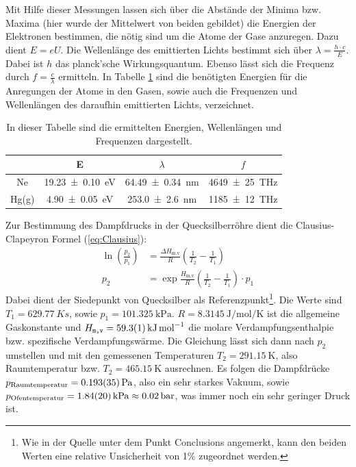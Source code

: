 	Mit Hilfe dieser Messungen lassen sich über die Abstände der Minima bzw. Maxima (hier wurde der Mittelwert von beiden gebildet) die Energien der Elektronen bestimmen, die nötig sind um die Atome der Gase anzuregen.
	Dazu dient $E=eU$. 
	Die Wellenlänge des emittierten Lichts bestimmt sich über $\lambda = \frac{h \cdot c}{E}$.
	Dabei ist $h$ das planck'sche Wirkungsquantum.
	Ebenso lässt sich die Frequenz durch $f = \frac{c}{\lambda}$ ermitteln. 
	In Tabelle \ref{tab:Werte} sind die benötigten Energien für die Anregungen der Atome in den Gasen, sowie auch die Frequenzen und Wellenlängen des daraufhin emittierten Lichts, verzeichnet.
	\begin{table}
		\caption{In dieser Tabelle sind die ermittelten Energien, Wellenlängen und Frequenzen dargestellt.}
		\label{tab:Werte}
		\centering
		\begin{tabular}{c|c|c|c}
			& E & $\lambda$ & $f$ \\			
			\hline		
			Ne & \SI{19.23+-0.10}{\electronvolt} & \SI{64.49+-0.34}{\nano\meter} & \SI{4649+-25}{\tera\hertz} \\
			Hg(g) & \SI{4.90+-0.05}{\electronvolt} & \SI{253.0+-2.6}{\nano\meter} & \SI{1185+-12}{\tera\hertz} \\				
		\end{tabular}
	\end{table}

	Zur Bestimmung des Dampfdrucks in der Quecksilberröhre dient die Clausius-Clapeyron Formel (\ref{eq:Clausius}):
	\begin{align} \label{eq:Clausius}
		\ln(\frac{p_2}{p_1}) &= \frac{\Delta H_\text{m,v}}{R}\left( \frac{1}{T_2} - \frac{1}{T_1} \right) \\
		p_2 &= \exp{\frac{H_\text{m,v}}{R} \left( \frac{1}{T_2} - \frac{1}{T_1} \right) } \cdot p_1
	\end{align}
	Dabei dient der Siedepunkt von Quecksilber als Referenzpunkt\cite{boilingPoint}\footnote{Wie in der Quelle unter dem Punkt Conclusions angemerkt, kann den beiden Werten eine relative Unsicherheit von 1\% zugeordnet werden.}.
	Die Werte sind $T_1 = \SI{629.77}{K}s$, sowie $p_1 = \SI{101.325}{\kilo\pascal}$.
	$R = \SI{8.3145}{\joule\per\mol\per\kelvin}$ ist die allgemeine Gaskonstante\cite{Constants} und $H_\texttt{m,v} = \SI{59.3+-0.1}{\kilo\joule\per\mol}$ die molare Verdampfungsenthalpie bzw. spezifische Verdampfungswärme\cite{verdampfungswaerme}.
	Die Gleichung lässt sich dann nach $p_2$ umstellen und mit den gemessenen Temperaturen $T_2 = \SI{291.15}{\kelvin}$, also Raumtemperatur bzw. $T_2 = \SI{465.15}{\kelvin}$ ausrechnen.
	Es folgen die Dampfdrücke $p_\text{Raumtemperatur} = \SI{0.193+-0.035}{\pascal}$, also ein sehr starkes Vakuum, sowie $p_\text{Ofentemperatur} = \SI{1.84+-0.20}{\kilo\pascal}\approx \SI{0.02}{\bar}$, was immer noch ein sehr geringer Druck ist.
	
